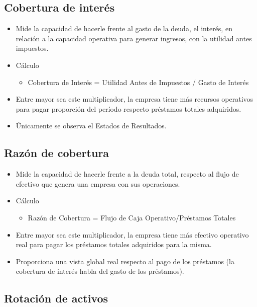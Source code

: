 \subsection{Cobertura de interés}
\begin{itemize}
    \item  Mide la capacidad de hacerle frente al gasto de la deuda, el interés, en relación a la capacidad operativa para generar ingresos, con la utilidad antes impuestos. 
    \item Cálculo 
    \begin{itemize}
        \item Cobertura de Interés =  Utilidad Antes de Impuestos / Gasto de Interés 
    \end{itemize}
    
    \item Entre mayor sea este multiplicador, la empresa tiene más recursos operativos 
    para pagar proporción del período respecto préstamos totales adquiridos. 
    \item Únicamente se observa el Estados de Resultados.
\end{itemize}
\subsection{Razón de cobertura}
\begin{itemize}
    \item  Mide la capacidad de hacerle frente a la deuda total, respecto al flujo de efectivo que genera una empresa con sus operaciones. 
    \item Cálculo 
    \begin{itemize}
        \item Razón de Cobertura =  Flujo de Caja Operativo/Préstamos Totales
    \end{itemize}
    \item Entre mayor sea este multiplicador, la empresa tiene más efectivo operativo real para 
    pagar los préstamos totales adquiridos para la misma. 
    \item Proporciona una vista global real respecto al pago de los préstamos (la cobertura de 
    interés habla del gasto de los préstamos).
\end{itemize}

\subsection{Rotación de activos}

